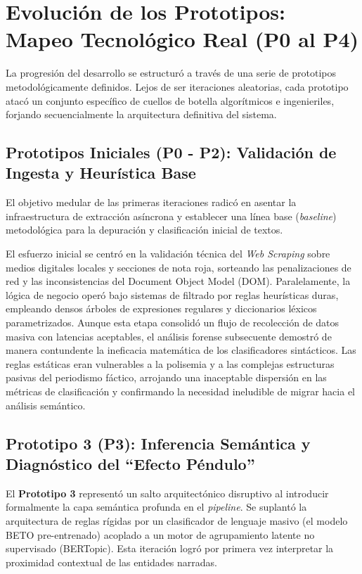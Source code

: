 \section{Evolución de los Prototipos: Mapeo Tecnológico Real (P0 al P4)}
\label{sec:met_evolucion_prototipos}

La progresión del desarrollo se estructuró a través de una serie de prototipos metodológicamente definidos. Lejos de ser iteraciones aleatorias, cada prototipo atacó un conjunto específico de cuellos de botella algorítmicos e ingenieriles, forjando secuencialmente la arquitectura definitiva del sistema.

\subsection{Prototipos Iniciales (P0 - P2): Validación de Ingesta y Heurística Base}
El objetivo medular de las primeras iteraciones radicó en asentar la infraestructura de extracción asíncrona y establecer una línea base (\textit{baseline}) metodológica para la depuración y clasificación inicial de textos.

El esfuerzo inicial se centró en la validación técnica del \textit{Web Scraping} sobre medios digitales locales y secciones de nota roja, sorteando las penalizaciones de red y las inconsistencias del Document Object Model (DOM). Paralelamente, la lógica de negocio operó bajo sistemas de filtrado por reglas heurísticas duras, empleando densos árboles de expresiones regulares y diccionarios léxicos parametrizados. Aunque esta etapa consolidó un flujo de recolección de datos masiva con latencias aceptables, el análisis forense subsecuente demostró de manera contundente la ineficacia matemática de los clasificadores sintácticos. Las reglas estáticas eran vulnerables a la polisemia y a las complejas estructuras pasivas del periodismo fáctico, arrojando una inaceptable dispersión en las métricas de clasificación y confirmando la necesidad ineludible de migrar hacia el análisis semántico.

\subsection{Prototipo 3 (P3): Inferencia Semántica y Diagnóstico del ``Efecto Péndulo''}
El \textbf{Prototipo 3} representó un salto arquitectónico disruptivo al introducir formalmente la capa semántica profunda en el \textit{pipeline}. Se suplantó la arquitectura de reglas rígidas por un clasificador de lenguaje masivo (el modelo BETO pre-entrenado) acoplado a un motor de agrupamiento latente no supervisado (BERTopic). Esta iteración logró por primera vez interpretar la proximidad contextual de las entidades narradas.

